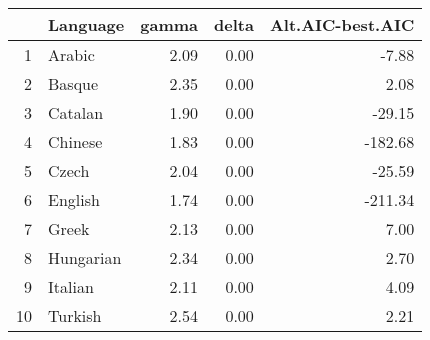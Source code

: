 \begin{table}[ht]
\centering
\begin{tabular}{rlrrr}
  \hline
 & Language & gamma & delta & Alt.AIC-best.AIC \\ 
  \hline
1 & Arabic & 2.09 & 0.00 & -7.88 \\ 
  2 & Basque & 2.35 & 0.00 & 2.08 \\ 
  3 & Catalan & 1.90 & 0.00 & -29.15 \\ 
  4 & Chinese & 1.83 & 0.00 & -182.68 \\ 
  5 & Czech & 2.04 & 0.00 & -25.59 \\ 
  6 & English & 1.74 & 0.00 & -211.34 \\ 
  7 & Greek & 2.13 & 0.00 & 7.00 \\ 
  8 & Hungarian & 2.34 & 0.00 & 2.70 \\ 
  9 & Italian & 2.11 & 0.00 & 4.09 \\ 
  10 & Turkish & 2.54 & 0.00 & 2.21 \\ 
   \hline
\end{tabular}
\end{table}

